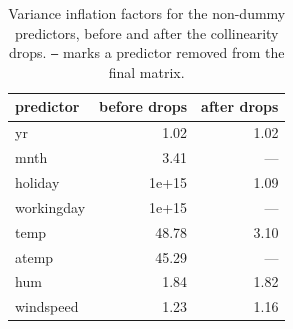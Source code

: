 \begin{table}[htbp]
\centering
\caption{Variance inflation factors for the non-dummy predictors, before and after the collinearity drops. \texttt{---} marks a predictor removed from the final matrix.}\label{tab:vif}
\begin{tabular}{lrr}
\toprule
predictor & before drops & after drops \\
\midrule
yr & 1.02 & 1.02 \\
mnth & 3.41 & --- \\
holiday & 1e+15 & 1.09 \\
workingday & 1e+15 & --- \\
temp & 48.78 & 3.10 \\
atemp & 45.29 & --- \\
hum & 1.84 & 1.82 \\
windspeed & 1.23 & 1.16 \\
\bottomrule
\end{tabular}
\end{table}

